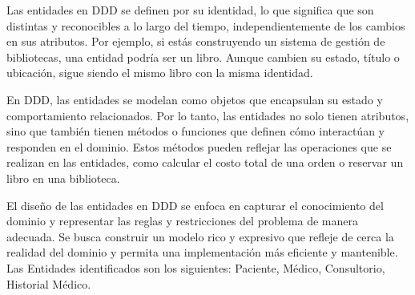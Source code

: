 Las entidades en DDD se definen por su identidad, lo que significa que son distintas y reconocibles a lo largo del tiempo,
independientemente de los cambios en sus atributos. Por ejemplo, si estás construyendo un sistema de gestión de bibliotecas, 
una entidad podría ser un libro. Aunque cambien su estado, título o ubicación, sigue siendo el mismo libro con la misma identidad.

En DDD, las entidades se modelan como objetos que encapsulan su estado y comportamiento relacionados. Por lo tanto, 
las entidades no solo tienen atributos, sino que también tienen métodos o funciones que definen cómo interactúan y 
responden en el dominio. Estos métodos pueden reflejar las operaciones que se realizan en las entidades, como calcular 
el costo total de una orden o reservar un libro en una biblioteca.

El diseño de las entidades en DDD se enfoca en capturar el conocimiento del dominio y representar las reglas y 
restricciones del problema de manera adecuada. Se busca construir un modelo rico y expresivo que refleje de cerca 
la realidad del dominio y permita una implementación más eficiente y mantenible. 
Las Entidades identificados son los siguientes: Paciente, Médico, Consultorio, Historial Médico.

  

